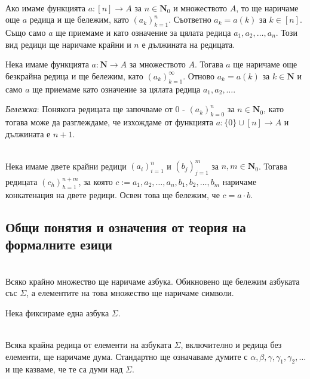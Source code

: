 \documentclass[12pt,twoside,a4paper]{article}
\begin{document}
	\begin{definition}[редица]~\\
		\indent Ако имаме функцията $a \colon [n] \to A$ за $n \in \mathbf{N}_0$ и множеството $A$, то ще наричаме още $a$ редица и ще бележим, като $(a_k)_{k=1}^{n}$. Съответно $a_k=a(k)$ за $k \in [n]$. Също само $a$ ще приемаме и като означение за цялата редица $a_1, a_2, \dots, a_n$. Този вид редици ще наричаме крайни и $n$ е дължината на редицата.
		
		Нека имаме функцията $a \colon \mathbf{N} \to A$ за множеството $A$. Тогава $a$ ще наричаме още безкрайна редица и ще бележим, като $(a_k)_{k=1}^\infty$. Отново $a_k=a(k)$ за $k \in \mathbf{N}$ и само $a$ ще приемаме като означение за цялата редица $a_1, a_2, \dots$.
		
		\textit{Бележка}: Понякога редицата ще започваме от 0 - $(a_k)_{k=0}^{n}$ за $n \in \mathbf{N}_0$, като тогава може да разглеждаме, че изхождаме от функцията $a \colon \{0\} \cup [n] \to A$ и дължината е $n+1$.
	\end{definition}
	
	\begin{definition}~\\
		\indent Нека имаме двете крайни редици $(a_i)_{i=1}^n$ и $(b_j)_{j=1}^m$ за $n,m \in \mathbf{N}_0$. Тогава редицата $(c_h)_{h=1}^{n+m}$, за която $c := a_1, a_2, \dots, a_n, b_1, b_2, \dots, b_m$ наричаме конкатенация на двете редици. Освен това ще бележим, че $c = a \cdot b$.
	\end{definition}
	
	\subsection{Общи понятия и означения от теория на формалните езици}
	\begin{definition}[азбука]~\\
		\indent Всяко крайно множество ще наричаме азбука. Обикновено ще бележим азбуката със $\Sigma$, а елементите на това множество ще наричаме символи.
	\end{definition}
	
	Нека фиксираме една азбука $\Sigma$.
	
	\begin{definition}[дума]~\\
		\indent Всяка крайна редица от елементи на азбуката $\Sigma$, включително и редица без елементи, ще наричаме дума. Стандартно ще означаваме думите с $\alpha, \beta, \gamma, \gamma_1, \gamma_2, \dots$ и ще казваме, че те са думи над $\Sigma$.
	\end{definition}
	
\end{document}
